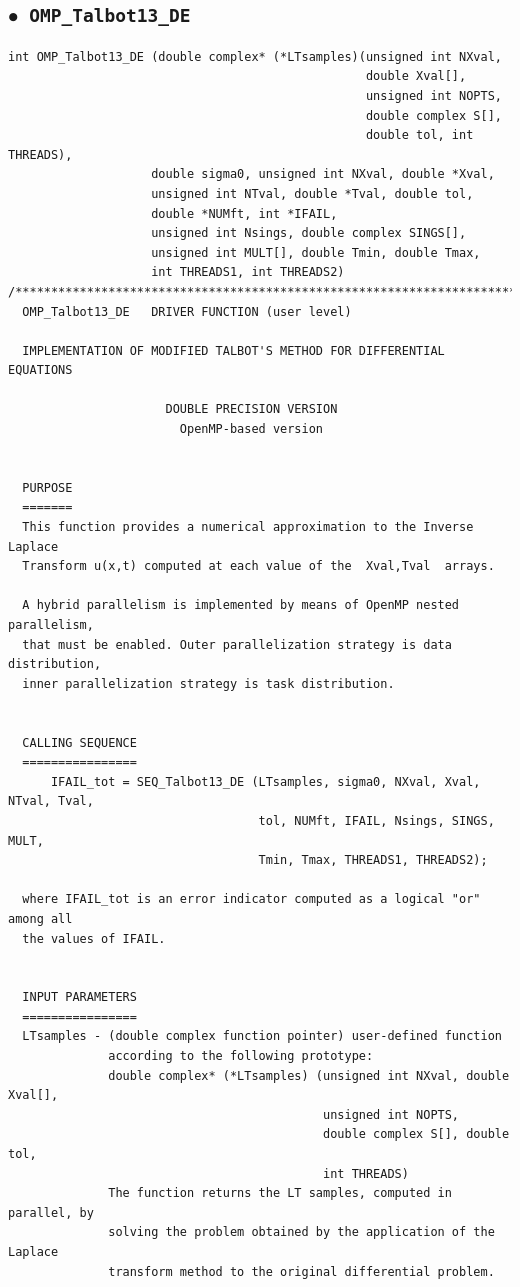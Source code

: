 \documentclass[a4paper,10pt]{report}%
\begin{document}
\subsection{\texorpdfstring{$\boldsymbol{\bullet}$}{ - }{\tt\ OMP\_Talbot13\_DE}}
\begin{lstlisting}
int OMP_Talbot13_DE (double complex* (*LTsamples)(unsigned int NXval,
                                                  double Xval[],
                                                  unsigned int NOPTS,
                                                  double complex S[],
                                                  double tol, int THREADS),
                    double sigma0, unsigned int NXval, double *Xval,
                    unsigned int NTval, double *Tval, double tol,
                    double *NUMft, int *IFAIL,
                    unsigned int Nsings, double complex SINGS[],
                    unsigned int MULT[], double Tmin, double Tmax,
                    int THREADS1, int THREADS2)
/*****************************************************************************
  OMP_Talbot13_DE   DRIVER FUNCTION (user level)

  IMPLEMENTATION OF MODIFIED TALBOT'S METHOD FOR DIFFERENTIAL EQUATIONS

                      DOUBLE PRECISION VERSION
                        OpenMP-based version


  PURPOSE
  =======
  This function provides a numerical approximation to the Inverse Laplace
  Transform u(x,t) computed at each value of the  Xval,Tval  arrays.

  A hybrid parallelism is implemented by means of OpenMP nested parallelism,
  that must be enabled. Outer parallelization strategy is data distribution,
  inner parallelization strategy is task distribution.


  CALLING SEQUENCE
  ================
      IFAIL_tot = SEQ_Talbot13_DE (LTsamples, sigma0, NXval, Xval, NTval, Tval,
                                   tol, NUMft, IFAIL, Nsings, SINGS, MULT,
                                   Tmin, Tmax, THREADS1, THREADS2);

  where IFAIL_tot is an error indicator computed as a logical "or" among all
  the values of IFAIL.


  INPUT PARAMETERS
  ================
  LTsamples - (double complex function pointer) user-defined function
              according to the following prototype:
              double complex* (*LTsamples) (unsigned int NXval, double Xval[],
                                            unsigned int NOPTS,
                                            double complex S[], double tol,
                                            int THREADS)
              The function returns the LT samples, computed in parallel, by
              solving the problem obtained by the application of the Laplace
              transform method to the original differential problem.


\end{lstlisting}
\end{document}
